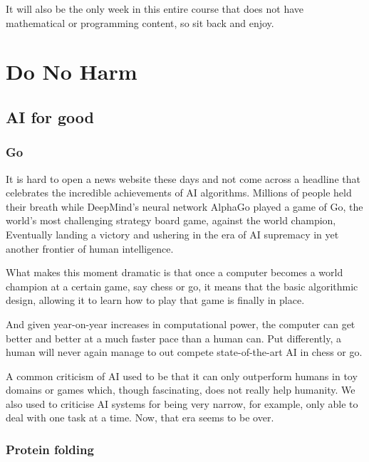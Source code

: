 \documentclass[
]{book}
\theoremstyle{definition}
\theoremstyle{definition}
\theoremstyle{definition}
\theoremstyle{definition}
\theoremstyle{remark}
\begin{document}
It will also be the only week in this entire course that does not have mathematical or programming content, so sit back and enjoy.

\hypertarget{do-no-harm}{%
\section{Do No Harm}\label{do-no-harm}}

\hypertarget{ai-for-good}{%
\subsection{AI for good}\label{ai-for-good}}

\hypertarget{go}{%
\subsubsection{Go}\label{go}}

It is hard to open a news website these days and not come across a headline that celebrates the incredible achievements of AI algorithms. Millions of people held their breath while DeepMind's neural network AlphaGo played a game of Go, the world's most challenging strategy board game, against the world champion, Eventually landing a victory and ushering in the era of AI supremacy in yet another frontier of human intelligence.

What makes this moment dramatic is that once a computer becomes a world champion at a certain game, say chess or go, it means that the basic algorithmic design, allowing it to learn how to play that game is finally in place.

And given year-on-year increases in computational power, the computer can get better and better at a much faster pace than a human can. Put differently,
a human will never again manage to out compete state-of-the-art AI in chess or go.

A common criticism of AI used to be that it can only outperform humans in toy
domains or games which, though fascinating, does not really help humanity. We also used to criticise AI systems for being very narrow, for example, only able to deal with one task at a time. Now, that era seems to be over.

\hypertarget{protein-folding}{%
\subsubsection{Protein folding}\label{protein-folding}}
\end{document}

